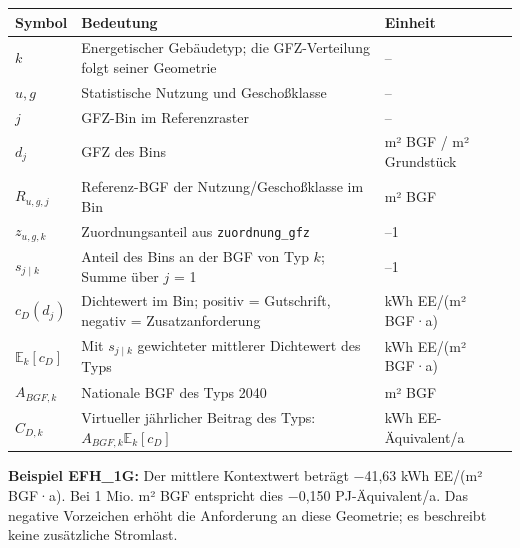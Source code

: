 \documentclass[
  ngerman,
  a4paper,
  DIV=11]{scrreprt}
\newcounter{none} %
\begin{document}
{\def\LTcaptype{none} %
\begin{longtable}[]{@{}
  >{\raggedright\arraybackslash}p{}
  >{\raggedright\arraybackslash}p{}
  >{\raggedright\arraybackslash}p{}@{}}
\toprule\noalign{}
\begin{minipage}[b]{\linewidth}\raggedright
Symbol
\end{minipage} & \begin{minipage}[b]{\linewidth}\raggedright
Bedeutung
\end{minipage} & \begin{minipage}[b]{\linewidth}\raggedright
Einheit
\end{minipage} \\
\midrule\noalign{}
\endhead
\bottomrule\noalign{}
\endlastfoot
\(k\) & Energetischer Gebäudetyp; die GFZ-Verteilung folgt seiner
Geometrie & -- \\
\(u,g\) & Statistische Nutzung und Geschoßklasse & -- \\
\(j\) & GFZ-Bin im Referenzraster & -- \\
\(d_j\) & GFZ des Bins & m² BGF / m² Grundstück \\
\(R_{u,g,j}\) & Referenz-BGF der Nutzung/Geschoßklasse im Bin & m²
BGF \\
\(z_{u,g,k}\) & Zuordnungsanteil aus \texttt{zuordnung\_gfz} & 0--1 \\
\(s_{j\mid k}\) & Anteil des Bins an der BGF von Typ \(k\); Summe über
\(j\) = 1 & 0--1 \\
\(c_D(d_j)\) & Dichtewert im Bin; positiv = Gutschrift, negativ =
Zusatzanforderung & kWh EE/(m² BGF·a) \\
\(\mathbb E_k[c_D]\) & Mit \(s_{j\mid k}\) gewichteter mittlerer
Dichtewert des Typs & kWh EE/(m² BGF·a) \\
\(A_{BGF,k}\) & Nationale BGF des Typs 2040 & m² BGF \\
\(C_{D,k}\) & Virtueller jährlicher Beitrag des Typs:
\(A_{BGF,k}\mathbb E_k[c_D]\) & kWh EE-Äquivalent/a \\
\end{longtable}
}

\textbf{Beispiel EFH\_1G:} Der mittlere Kontextwert beträgt −41,63 kWh
EE/(m² BGF·a). Bei 1 Mio. m² BGF entspricht dies −0,150 PJ-Äquivalent/a.
Das negative Vorzeichen erhöht die Anforderung an diese Geometrie; es
beschreibt keine zusätzliche Stromlast.
\end{document}
